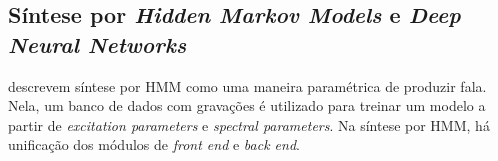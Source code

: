 \subsection{Síntese por \emph{Hidden Markov Models} e \emph{Deep Neural Networks}}
 descrevem síntese por HMM como uma maneira paramétrica de
produzir fala. Nela, um banco de dados com gravações é utilizado para treinar um
modelo a partir de \emph{excitation parameters} e \emph{spectral parameters}. Na
síntese por HMM, há unificação dos módulos de \emph{front end} e \emph{back
end}.


% 



